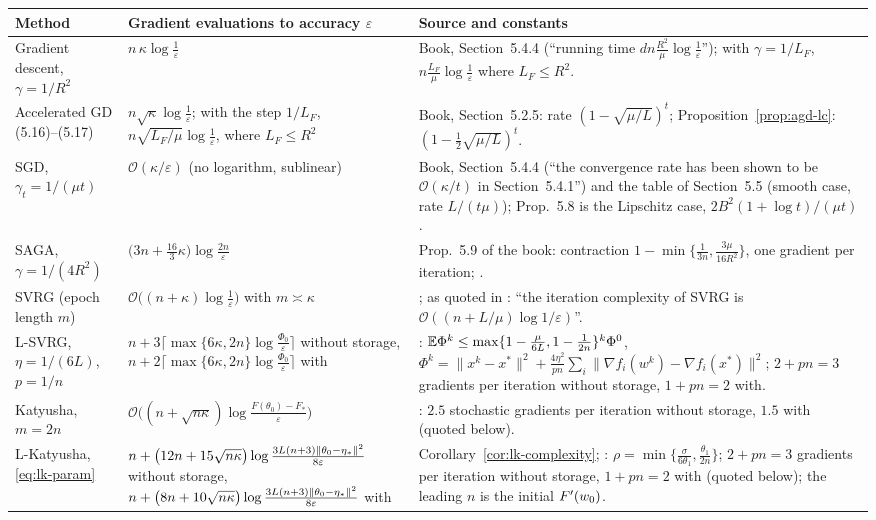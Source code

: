 \begin{table}[htbp]
\centering\small
\begin{tabular}{p{3.4cm}p{6.4cm}p{5.3cm}}
\hline
Method & Gradient evaluations to accuracy $\varepsilon$ & Source and constants \\
\hline
Gradient descent, $\gamma=1/R^2$ & $n\,\kappa\log\frac1\varepsilon$ & Book, Section~5.4.4 (``running time $dn\frac{R^2}\mu\log\frac1\varepsilon$''); with $\gamma=1/L_F$, $n\frac{L_F}\mu\log\frac1\varepsilon$ where $L_F\le R^2$. \\
Accelerated GD (5.16)--(5.17) & $n\sqrt{\kappa}\log\frac1\varepsilon$; with the step $1/L_F$, $n\sqrt{L_F/\mu}\log\frac1\varepsilon$, where $L_F\le R^2$ & Book, Section~5.2.5: rate $(1-\sqrt{\mu/L})^t$; Proposition~\ref{prop:agd-lc}: $(1-\frac12\sqrt{\mu/L})^t$. \\
SGD, $\gamma_t=1/(\mu t)$ & $\mathcal O(\kappa/\varepsilon)$ (no logarithm, sublinear) & Book, Section~5.4.4 (``the convergence rate has been shown to be $\mathcal O(\kappa/t)$ in Section~5.4.1'') and the table of Section~5.5 (smooth case, rate $L/(t\mu)$); Prop.~5.8 is the Lipschitz case, $2B^2(1+\log t)/(\mu t)$. \\
SAGA, $\gamma=1/(4R^2)$ & $\big(3n+\frac{16}3\kappa\big)\log\frac{2n}\varepsilon$ & Prop.~5.9 of the book: contraction $1-\min\{\frac1{3n},\frac{3\mu}{16R^2}\}$, one gradient per iteration; \cite{defazio2014saga}. \\
SVRG (epoch length $m$) & $\mathcal O\big((n+\kappa)\log\frac1\varepsilon\big)$ with $m\asymp\kappa$ & \cite{johnson2013accelerating}; as quoted in \cite[Section~1]{kovalev2020dont}: ``the iteration complexity of SVRG is $\mathcal O((n+L/\mu)\log1/\varepsilon)$''. \\
L-SVRG, $\eta=1/(6L)$, $p=1/n$ & $n+3\big\lceil\max\{6\kappa,2n\}\log\frac{\Phi_0}\varepsilon\big\rceil$ without storage, $n+2\big\lceil\max\{6\kappa,2n\}\log\frac{\Phi_0}\varepsilon\big\rceil$ with & \cite[Theorem~5]{kovalev2020dont}: $\mathbb{E}\Phi^k\le\max\{1-\frac\mu{6L},1-\frac1{2n}\}^k\Phi^0$, $\Phi^k=\|x^k-x^\ast\|^2+\frac{4\eta^2}{pn}\sum_i\|\nabla f_i(w^k)-\nabla f_i(x^\ast)\|^2$; $2+pn=3$ gradients per iteration without storage, $1+pn=2$ with. \\
Katyusha, $m=2n$ & $\mathcal O\big((n+\sqrt{n\kappa})\log\frac{F(\theta_0)-F_\ast}\varepsilon\big)$ & \cite[Theorem~2.1, Remark~2.2 and footnote~11]{allenzhu2018katyusha}: $2.5$ stochastic gradients per iteration without storage, $1.5$ with (quoted below). \\
L-Katyusha, \eqref{eq:lk-param} & $n+\big(12n+15\sqrt{n\kappa}\big)\log\frac{3L(n+3)\left\|\theta_0-\eta_\ast\right\|^2}{8\varepsilon}$ without storage, $n+\big(8n+10\sqrt{n\kappa}\big)\log\frac{3L(n+3)\left\|\theta_0-\eta_\ast\right\|^2}{8\varepsilon}$ with & Corollary~\ref{cor:lk-complexity}; \cite[Theorem~11]{kovalev2020dont}: $\rho=\min\{\frac\sigma{6\theta_1},\frac{\theta_1}{2n}\}$; $2+pn=3$ gradients per iteration without storage, $1+pn=2$ with (quoted below); the leading $n$ is the initial $F'(w_0)$. \\

\end{tabular}
\end{table}
